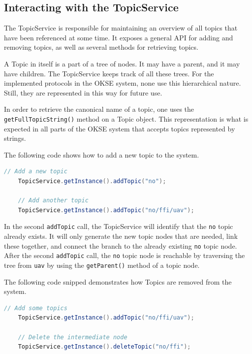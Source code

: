 \subsection{Interacting with the TopicService}
\label{subsec:components-interacting_with_the_topicservice}

The TopicService is responsible for maintaining an overview of all topics that have been referenced at some time. It exposes a general API for adding and removing topics, as well as several methods for retrieving topics.

A Topic in itself is a part of a tree of nodes. It may have a parent, and it may have children. The TopicService keeps track of all these trees. For the implemented protocols in the OKSE system, none use this hierarchical nature. Still, they are represented in this way for future use.

In order to retrieve the canonical name of a topic, one uses the \verb!getFullTopicString()! method on a Topic object. This representation is what is expected in all parts of the OKSE system that accepts topics represented by strings.

The following code shows how to add a new topic to the system.

\begin{lstlisting}[language=Java, captionpos=b, caption=Adding a new topic, frame=bt, showstringspaces=false]
    // Add a new topic
    TopicService.getInstance().addTopic("no");
    
    // Add another topic
    TopicService.getInstance().addTopic("no/ffi/uav");
\end{lstlisting}

In the second \verb!addTopic! call, the TopicService will identify that the \verb!no! topic already exists. It will only generate the new topic nodes that are needed, link these together, and connect the branch to the already existing \verb!no! topic node. After the second \verb!addTopic! call, the \verb!no! topic node is reachable by traversing the tree from \verb!uav! by using the \verb!getParent()! method of a topic node.

The following code snipped demonstrates how Topics are removed from the system.

\begin{lstlisting}[language=Java, captionpos=b, caption=Deleting a topic, frame=bt, showstringspaces=false]
    // Add some topics
    TopicService.getInstance().addTopic("no/ffi/uav");
    
    // Delete the intermediate node
    TopicService.getInstance().deleteTopic("no/ffi");
\end{lstlisting}

